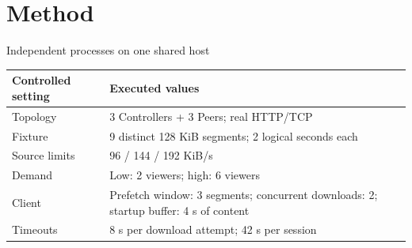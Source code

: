 \section{Method}
\begin{frame}{Independent processes on one shared host}
\small
\begin{tabularx}{\textwidth}{lY}
\toprule Controlled setting & Executed values \\\midrule
Topology & 3 Controllers + 3 Peers; real HTTP/TCP\\
Fixture & 9 distinct 128 KiB segments; 2 logical seconds each\\
Source limits & 96 / 144 / 192 KiB/s\\
Demand & Low: 2 viewers; high: 6 viewers\\
Client & Prefetch window: 3 segments; concurrent downloads: 2; startup buffer: 4 s of content\\
Timeouts & 8 s per download attempt; 42 s per session\\\bottomrule
\end{tabularx}
\end{frame}


